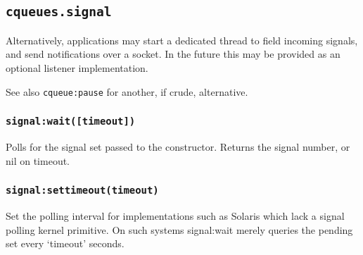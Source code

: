 \documentclass[11pt, oneside]{memoir}
\newcommand{\routine}[1]{\texttt{#1} }
\newcommand{\fn}[1]{\texttt{#1} }
\newcounter{toccols}
\newenvironment{Module}[1]{
	\subsection{\texttt{#1}}
	\addtocontents{toc}{
		\protect\begin{multicols}{\value{toccols}}
	}
}{
	\addtocontents{toc}{\protect\end{multicols}}
}
\begin{document}
\begin{Module}{cqueues.signal}
Alternatively, applications may start a dedicated thread to field incoming signals, and send notifications over a socket. In the future this may be provided as an optional listener implementation.

See also \routine{cqueue:pause} for another, if crude, alternative.

\subsubsection[\fn{signal:wait}]{\fn{signal:wait([timeout])}}
Polls for the signal set passed to the constructor. Returns the signal number, or nil on timeout.

\subsubsection[\fn{signal:settimeout}]{\fn{signal:settimeout(timeout)}}
Set the polling interval for implementations such as Solaris which lack a signal polling kernel primitive. On such systems signal:wait merely queries the pending set every `timeout' seconds.

\end{Module}
\end{document}
